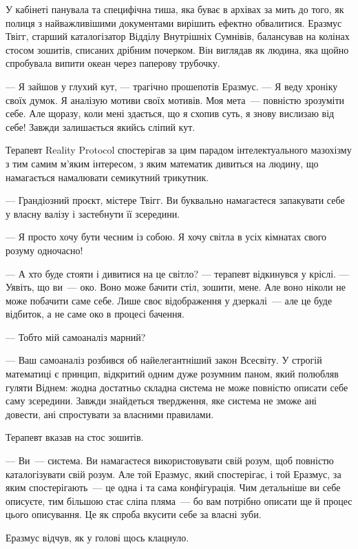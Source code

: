 \documentclass[12pt, a4paper, openany]{book}
\begin{document}
\begin{realitybox}
У кабінеті панувала та специфічна тиша, яка буває в архівах за мить до того, як полиця з найважливішими документами вирішить ефектно обвалитися. Еразмус Твігг, старший каталогізатор Відділу Внутрішніх Сумнівів, балансував на колінах стосом зошитів, списаних дрібним почерком. Він виглядав як людина, яка щойно спробувала випити океан через паперову трубочку.

--- Я зайшов у глухий кут, --- трагічно прошепотів Еразмус. --- Я веду хроніку своїх думок. Я аналізую мотиви своїх мотивів. Моя мета~--- повністю зрозуміти себе. Але щоразу, коли мені здається, що я схопив суть, я знову вислизаю від себе! Завжди залишається якийсь сліпий кут.

\medskip
Терапевт Reality Protocol спостерігав за цим парадом інтелектуального мазохізму з тим самим м'яким інтересом, з яким математик дивиться на людину, що намагається намалювати семикутний трикутник.

--- Грандіозний проєкт, містере Твігг. Ви буквально намагаєтеся запакувати себе у власну валізу і застебнути її зсередини.

--- Я просто хочу бути чесним із собою. Я хочу світла в усіх кімнатах свого розуму одночасно!

--- А хто буде стояти і дивитися на це світло? --- терапевт відкинувся у кріслі. --- Уявіть, що ви~--- око. Воно може бачити стіл, зошити, мене. Але воно ніколи не може побачити саме себе. Лише своє відображення у дзеркалі~--- але це буде відбиток, а не саме око в процесі бачення.

--- Тобто мій самоаналіз марний?

--- Ваш самоаналіз розбився об найелегантніший закон Всесвіту. У строгій математиці є принцип, відкритий одним дуже розумним паном, який полюбляв гуляти Віднем: жодна достатньо складна система не може повністю описати себе саму зсередини. Завжди знайдеться твердження, яке система не зможе ані довести, ані спростувати за власними правилами.

Терапевт вказав на стос зошитів.

--- Ви~--- система. Ви намагаєтеся використовувати свій розум, щоб повністю каталогізувати свій розум. Але той Еразмус, який спостерігає, і той Еразмус, за яким спостерігають~--- це одна і та сама конфігурація. Чим детальніше ви себе описуєте, тим більшою стає сліпа пляма~--- бо вам потрібно описати ще й процес цього описування. Це як спроба вкусити себе за власні зуби.

\medskip
Еразмус відчув, як у голові щось клацнуло.


\end{realitybox}
\end{document}
